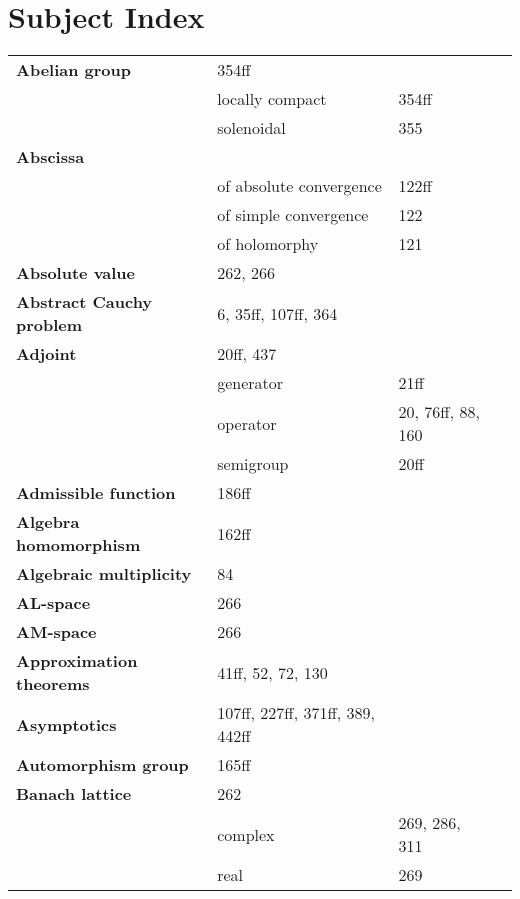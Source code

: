 \documentclass[10pt]{scrartcl}
\begin{document}
\section*{Subject Index}
\raggedright
\begin{longtable}{>{\bfseries}p{5cm}p{4cm}p{4cm}p{4cm}}

Abelian group 	& 354ff \\
	& locally compact 	& 354ff \\
	& solenoidal 	& 355 \\

Abscissa 	& \\
	& of absolute convergence 	& 122ff \\
	& of simple convergence 	& 122 \\
	& of holomorphy 	& 121 \\

Absolute value 	& 262, 266 \\

Abstract Cauchy problem 	& 6, 35ff, 107ff, 364 \\

Adjoint 	& 20ff, 437 \\
	& generator 	& 21ff \\
	& operator 	& 20, 76ff, 88, 160 \\
	& semigroup 	& 20ff \\

Admissible function 	& 186ff \\

Algebra homomorphism 	& 162ff \\

Algebraic multiplicity 	& 84 \\

AL-space 	& 266 \\

AM-space 	& 266 \\

Approximation theorems 	& 41ff, 52, 72, 130 \\

Asymptotics 	& 107ff, 227ff, 371ff, 389, 442ff \\

Automorphism group 	& 165ff \\

Banach lattice 	& 262 \\
	& complex 	& 269, 286, 311 \\
	& real 	& 269 \\


\end{longtable}
\end{document}
